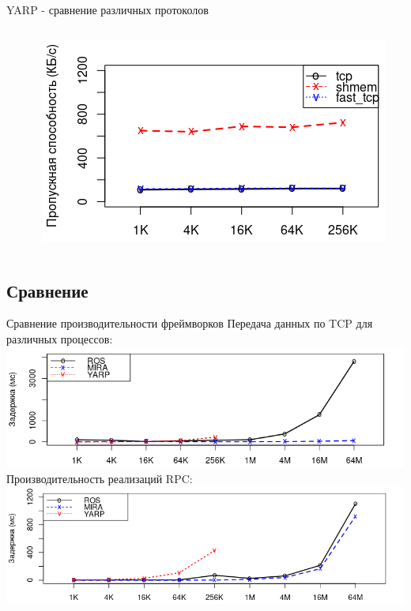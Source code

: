 \begin{frame}{YARP - сравнение различных протоколов}
\begin{columns}[onlytextwidth]
\begin{column}{0.5\textwidth}
	\end{column}
	\begin{column}{0.5\textwidth}
		\includegraphics[width=\textwidth]{img/yarp/yarp_protocol_rpc_bw.png}
	\end{column}
\end{columns}
\end{frame}

\subsection{Сравнение}
\begin{frame}{Сравнение производительности фреймворков}
	Передача данных по TCP для различных процессов:
	\includegraphics[width=\textwidth]{img/comp/comp_tcp_l.png}
	Производительность реализаций RPC:
	\includegraphics[width=\textwidth]{img/comp/comp_rpc_l.png}
\end{frame}

